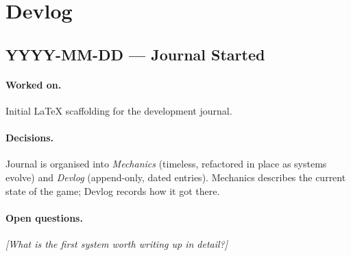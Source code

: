 \section{Devlog}

%
%
%
%
%
%

\subsection{YYYY-MM-DD --- Journal Started}

\paragraph{Worked on.}
Initial \LaTeX{} scaffolding for the development journal.

\paragraph{Decisions.}
Journal is organised into \emph{Mechanics} (timeless, refactored
in place as systems evolve) and \emph{Devlog} (append-only,
dated entries). Mechanics describes the current state of the
game; Devlog records how it got there.

\paragraph{Open questions.}
\textit{[What is the first system worth writing up in detail?]}

\newpage
